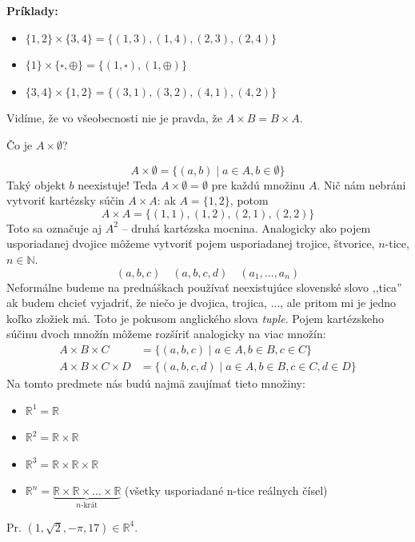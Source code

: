 \noindent\textbf{Príklady:}
\begin{itemize}
    \item $\{1,2\} \times \{3,4\} = \{(1,3), (1,4), (2,3), (2,4)\}$
    \item $\{1\} \times \{\square, \oplus\} = \{(1,\square), (1,\oplus)\}$
    \item $\{3,4\} \times \{1,2\} = \{(3,1), (3,2), (4,1), (4,2)\}$
\end{itemize}
Vidíme, že vo všeobecnosti nie je pravda, že $A \times B = B \times A$.
\begin{question}
Čo je $A \times \emptyset$?
\end{question}
$$ A \times \emptyset = \{(a,b) \mid a \in A, b \in \emptyset\} $$
Taký objekt $b$ neexistuje!
Teda $A \times \emptyset = \emptyset$ pre každú množinu $A$.
Nič nám nebráni vytvoriť kartézsky súčin $A \times A$: ak $A=\{1,2\}$, potom
$$A \times A = \{(1,1), (1,2), (2,1), (2,2)\}$$
Toto sa označuje aj $A^2$ -- druhá kartézska mocnina.
Analogicky ako pojem usporiadanej dvojice môžeme vytvoriť pojem usporiadanej trojice,
štvorice, $n$-tice, $n \in \mathbb{N}$.
\[
(a,b,c)\quad(a,b,c,d)\quad(a_1,\dots,a_n)
\]
Neformálne budeme na prednáškach používať
neexistujúce slovenské slovo ,,tica'' ak budem chcieť vyjadriť, že niečo je dvojica,
trojica, ..., ale pritom mi je jedno koľko zložiek má.
Toto je pokusom anglického
slova \emph{tuple}.
Pojem kartézskeho súčinu dvoch množín môžeme rozšíriť analogicky na viac množín:
\begin{align*}
    A \times B \times C &= \{(a,b,c) \mid a \in A, b \in B, c \in C\} \\
    A \times B \times C \times D &= \{(a,b,c,d) \mid a \in A, b \in B, c \in C, d \in D\}
\end{align*}
Na tomto predmete nás budú najmä zaujímať tieto množiny:
\begin{itemize}
    \item $\mathbb{R}^1 = \mathbb{R}$
    \item $\mathbb{R}^2 = \mathbb{R} \times \mathbb{R}$
    \item $\mathbb{R}^3 = \mathbb{R} \times \mathbb{R} \times \mathbb{R}$
    \item $\mathbb{R}^n = \underbrace{\mathbb{R} \times \mathbb{R} \times \dots \times \mathbb{R}}_{n\text{-krát}}$ (všetky usporiadané n-tice reálnych čísel)
\end{itemize}
Pr.
$(1, \sqrt{2}, -\pi, 17) \in \mathbb{R}^4$.



